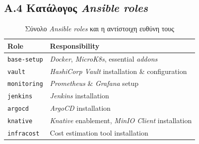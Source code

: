 \subsection*{Α.4 Κατάλογος \textit{Ansible roles}}

\begin{table}[htbp]
\centering
\renewcommand{\arraystretch}{1.5}
\caption{Σύνολο \textit{Ansible roles} και η αντίστοιχη ευθύνη τους}
\label{tab:roles}
\small
\begin{tabularx}{\textwidth}{| >{\centering\arraybackslash}p{3cm} | X |}
\hline
\rowcolor{HUAblue} 
\textbf{\color{white} Role} & \textbf{\color{white} Responsibility} \\ \hline

\texttt{base-setup} & \textit{Docker}, \textit{MicroK8s}, essential \textit{addons} \\ \hline

\rowcolor{lightgray!30}
\texttt{vault} & \textit{HashiCorp Vault} installation \& configuration \\ \hline

\texttt{monitoring} & \textit{Prometheus} \& \textit{Grafana} setup \\ \hline

\rowcolor{lightgray!30}
\texttt{jenkins} & \textit{Jenkins} installation \\ \hline

\texttt{argocd} & \textit{ArgoCD} installation \\ \hline

\rowcolor{lightgray!30}
\texttt{knative} & \textit{Knative} enablement, \textit{MinIO Client} installation \\ \hline

\texttt{infracost} & Cost estimation tool installation \\ \hline
\end{tabularx}
\end{table}

\newpage



